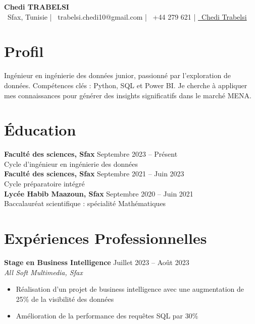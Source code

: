 \documentclass[9pt]{article}
\begin{document}
\begin{center}
    {\Large \textbf{Chedi TRABELSI}}\\[0.3em]
    \faMapMarker\ Sfax, Tunisie | \quad
    \faEnvelope~trabelsi.chedi10@gmail.com \quad | \quad 
    \faPhone*~+44 279 621 \quad |
    \href{https://www.linkedin.com/in/cheditrabelsi}{\raisebox{-0.05\height} \faLinkedin\ Chedi Trabelsi}
\end{center}
\vspace{0.2em}

\section*{Profil}
Ingénieur en ingénierie des données junior, passionné par l'exploration de données. Compétences clés : Python, SQL et Power BI. Je cherche à appliquer mes connaissances pour générer des insights significatifs dans le marché MENA.

\section*{Éducation}
\textbf{Faculté des sciences, Sfax} \hfill Septembre 2023 -- Présent \\
Cycle d'ingénieur en ingénierie des données \\
\textbf{Faculté des sciences, Sfax} \hfill Septembre 2021 -- Juin 2023 \\
Cycle préparatoire intégré \\
\textbf{Lycée Habib Maazoun, Sfax} \hfill Septembre 2020 -- Juin 2021 \\
Baccalauréat scientifique : spécialité Mathématiques

\section*{Expériences Professionnelles}
\textbf{Stage en Business Intelligence} \hfill Juillet 2023 -- Août 2023 \\
\textit{\small All Soft Multimedia, Sfax} \vspace{-2mm}
\begin{itemize}[itemsep=-0.2em] 
    \item Réalisation d'un projet de business intelligence avec une augmentation de 25\% de la visibilité des données
    \item Amélioration de la performance des requêtes SQL par 30\%
\end{itemize}
\vspace{1mm}
\end{document}
